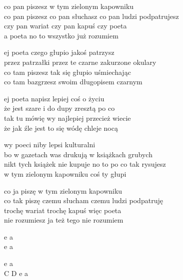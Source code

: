 \begin{text}
    co pan piszesz w tym zielonym kapowniku\\
    co pan piszesz co pan słuchasz co pan ludzi podpatrujesz\\
    czy pan wariat czy pan kapuś czy poeta\\
    a poeta no to wszystko już rozumiem

    ej poeta czego głupio jakoś patrzysz\\
    przez patrzałki przez te czarne zakurzone okulary\\
    co tam piszesz tak się głupio uśmiechając\\
    co tam bazgrzesz swoim długopisem czarnym

    ej poeta napisz lepiej coś o życiu\\
    że jest szare i do dupy zresztą po co\\
    tak tu mówię wy najlepiej przecież wiecie\\
    że jak źle jest to się wódę chleje nocą

    wy poeci niby lepsi kulturalni\\
    bo w gazetach was drukują w książkach grubych\\
    nikt tych książek nie kupuje no to po co tak rysujesz\\
    w tym zielonym kapowniku coś ty głupi

    co ja piszę w tym zielonym kapowniku\\
    co tak piszę czemu słucham czemu ludzi podpatruję\\
    trochę wariat trochę kapuś więc poeta\\
    nie rozumiesz ja też tego nie rozumiem
\end{text}
\begin{chord}
    e a\\
    e a
    
    e a\\
    C D e a
\end{chord}
